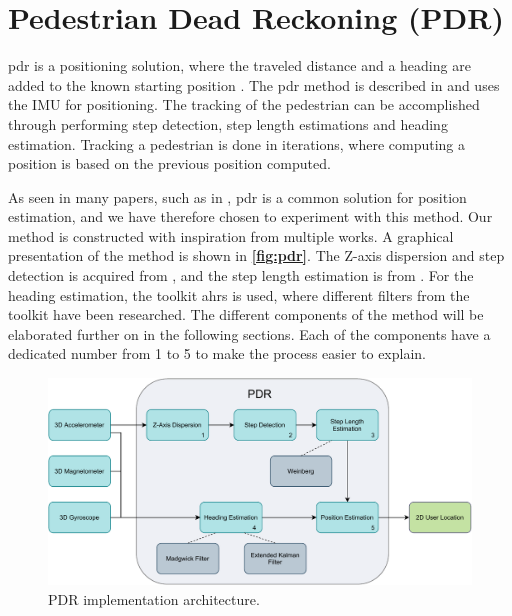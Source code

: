 \section{Pedestrian Dead Reckoning (PDR)} \label{sec:pdr}

\gls{pdr} is a positioning solution, where the traveled distance and a heading are added to the known starting position \cite{pdr_smartphonebased}. The \gls{pdr} method is described in \cite{HybridPositioningPaper} and uses the IMU for positioning. The tracking of the pedestrian can be accomplished through performing step detection, step length estimations and heading estimation. Tracking a pedestrian is done in iterations, where computing a position is based on the previous position computed.

As seen in many papers, such as in \cite{pdr_smartphonebased, HybridPositioningPaper, 6987239, 6782540}, \gls{pdr} is a common solution for position estimation, and we have therefore chosen to experiment with this method. Our method is constructed with inspiration from multiple works. A graphical presentation of the method is shown in \textbf{\autoref{fig:pdr}}. The Z-axis dispersion and step detection is acquired from \cite{peakdetection}, and the step length estimation is from \cite{HybridPositioningPaper}. For the heading estimation, the toolkit \gls{ahrs} is used, where different filters from the toolkit have been researched. The different components of the method will be elaborated further on in the following sections. Each of the components have a dedicated number from 1 to 5 to make the process easier to explain. 
\\

\begin{figure}[H]
    \centering
    \includegraphics[scale=0.7]{Images/Experiments/pdr.pdf}
    \caption{PDR implementation architecture.}
     \label{fig:pdr}
\end{figure}


